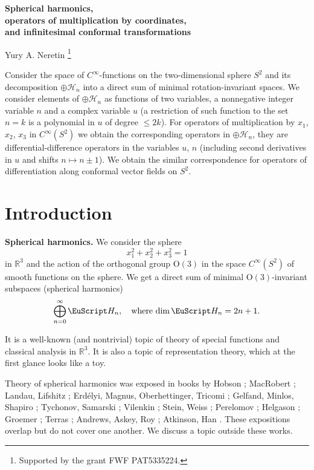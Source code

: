 \documentclass[]{amsart}
\newcounter{sec}
\newcounter{punct}[sec]
\def\punct{\refstepcounter{punct}{\arabic{sec}.\arabic{punct}.  }}
\def\COUNTERS{\addtocounter{sec}{1}
              \setcounter{punct}{0}
          \setcounter{equation}{0}
          \setcounter{theorem}{0}
          }
\renewcommand\O{\mathrm{O}}
\def\le{\leqslant}
\def\cH{\EuScript H}
\def\R {{\mathbb R }}
\begin{document}
\begin{center}
\bf \Large
Spherical harmonics,
\\
 operators of multiplication by coordinates,
 \\
  and infinitesimal conformal transformations

\bigskip

\sc \large

Yury A. Neretin%
\footnote{Supported by the grant FWF PAT5335224.}
\end{center}

\bigskip

{\small Consider the space of $C^\infty$-functions on the two-dimensional sphere $S^2$ and its decomposition $\oplus\mathcal H_n$ into a direct sum of minimal rotation-invariant spaces. 
 We consider elements of $\oplus\mathcal H_n$
 as functions of two variables, a nonnegative integer variable $n$
and a complex variable $u$ (a restriction of such function to the set $n=k$ is a polynomial in  $u$ of degree
$\le 2k$).  For operators of multiplication by  $x_1$, $x_2$, $x_3$ in $C^\infty(S^2)$ we obtain the corresponding operators in 
$\oplus\mathcal H_n$, they are differential-difference operators
in the variables $u$, $n$ (including second derivatives in $u$ and shifts $n\mapsto n\pm1$). We obtain the similar correspondence for operators of differentiation
along conformal vector fields on $S^2$. 
}

\section{Introduction}

\COUNTERS

{\bf \punct Spherical harmonics.}
We consider the sphere 
$$
x_1^2+x_2^2+x_3^2=1
$$
in $\R^3$ and the action of the  orthogonal
group $\O(3)$ in the space $C^\infty(S^2)$ of
smooth functions on the sphere.  
We get a direct sum of  
 minimal $\O(3)$-invariant subspaces
 (spherical harmonics) 
$$
\bigoplus_{n=0}^\infty \cH_n,\quad  
\text{where $\dim \cH_n={2n+1}$.}
$$

 It is a well-known (and nontrivial) topic of   theory of special functions and classical analysis in $\R^3$. It is also a topic
of representation theory, which at the first glance looks like a toy.

 
Theory of spherical harmonics was exposed in books by Hobson \cite{Hob};
MacRobert \cite{Mac};
Landau, Lifshitz \cite{LL};
Erd\'elyi, Magnus, Oberhettinger, Tricomi \cite{HTF2};
Gelfand, Minlos, Shapiro \cite{GMS}; %
Tychonov,  Samarski \cite{TS}; %
Vilenkin \cite{Vil};
Stein, Weiss \cite{SW}; %
Perelomov \cite{Per}; %
Helgason \cite{Hel}; %
Groemer \cite{Gro};
Terras \cite{Ter}; %
Andrews, Askey, Roy \cite{AAR};
Atkinson, Han \cite{AH}. %
These expositions overlap but do not cover one another.
We discuss a topic outside these works.
\end{document}
